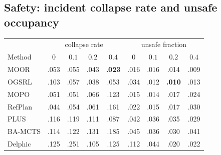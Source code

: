 \documentclass[11pt]{article}
\begin{document}
\subsection{Safety: incident collapse rate and unsafe occupancy}
\begin{longtable}{@{}lcccc|cccc@{}}
\toprule
& \multicolumn{4}{c}{collapse rate} & \multicolumn{4}{c}{unsafe fraction} \\
Method & $0$ & $0.1$ & $0.2$ & $0.4$ & $0$ & $0.1$ & $0.2$ & $0.4$ \\
\midrule
MOOR    & .053 & .055 & .043 & \textbf{.023} & .016 & .016 & .014 & .009 \\
OGSRL   & .103 & .057 & .038 & .053 & .034 & .012 & \textbf{.010} & .013 \\
MOPO    & .051 & .051 & .066 & .123 & .015 & .014 & .017 & .024 \\
RefPlan & .044 & .054 & .061 & .161 & .022 & .015 & .017 & .030 \\
PLUS    & .116 & .119 & .111 & .087 & .042 & .036 & .035 & .029 \\
BA-MCTS & .114 & .122 & .131 & .185 & .045 & .036 & .030 & .041 \\
Delphic & .125 & .251 & .105 & .125 & .112 & .044 & .020 & .022 \\
\bottomrule
\end{longtable}
\end{document}
